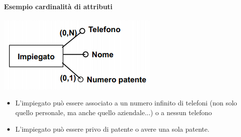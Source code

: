 \paragraph{Esempio cardinalità di attributi} \begin{center}\includegraphics{images/16.PNG}\end{center}
\begin{itemize}
	\item L'impiegato può essere associato a un numero infinito di telefoni (non solo quello personale, ma anche quello aziendale...) o a nessun telefono
	\item L'impiegato può essere privo di patente o avere una sola patente.
\end{itemize}
